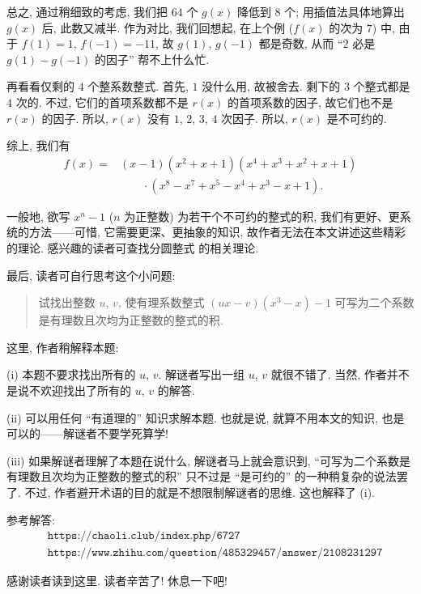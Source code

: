 \begin{example}
    总之, 通过稍细致的考虑, 我们把 $64$ 个 $g(x)$ 降低到 $8$ 个; 用插值法具体地算出 $g(x)$ 后, 此数又减半. 作为对比, 我们回想起, 在上个例 ($f(x)$ 的次为 $7$) 中, 由于 $f(1) = 1$, $f(-1) = -11$, 故 $g(1)$, $g(-1)$ 都是奇数, 从而 ``$2$ 必是 $g(1) - g(-1)$ 的因子'' 帮不上什么忙.

    再看看仅剩的 $4$ 个整系数整式. 首先, $1$ 没什么用, 故被舍去. 剩下的 $3$ 个整式都是 $4$ 次的. 不过, 它们的首项系数都不是 $r(x)$ 的首项系数的因子, 故它们也不是 $r(x)$ 的因子. 所以, $r(x)$ 没有 $1$, $2$, $3$, $4$ 次因子. 所以, $r(x)$ 是不可约的.

    综上, 我们有
    \begin{align*}
        f(x)
        = {} & (x-1) (x^2+x+1) (x^4+x^3+x^2+x+1)       \\
             & \qquad \cdot (x^8-x^7+x^5-x^4+x^3-x+1).
    \end{align*}
\end{example}

\begin{remark}
    一般地, 欲写 $x^n - 1$ ($n$ 为正整数) 为若干个不可约的整式的积, 我们有更好、更系统的方法——可惜, 它需要更深、更抽象的知识, 故作者无法在本文讲述这些精彩的理论. 感兴趣的读者可查找分圆整式  的相关理论.
\end{remark}

最后, 读者可自行思考这个小问题:

\begin{quotation}
    试找出整数 $u$, $v$, 使有理系数整式 $(ux - v)(x^3 - x) - 1$ 可写为二个系数是有理数且次均为正整数的整式的积.
\end{quotation}

这里, 作者稍解释本题:

(i) 本题不要求找出所有的 $u$, $v$. 解谜者写出一组 $u$, $v$ 就很不错了. 当然, 作者并不是说不欢迎找出了所有的 $u$, $v$ 的解答.

(ii) 可以用任何 ``有道理的'' 知识求解本题. 也就是说, 就算不用本文的知识, 也是可以的——解谜者不要学死算学!

(iii) 如果解谜者理解了本题在说什么, 解谜者马上就会意识到, ``可写为二个系数是有理数且次均为正整数的整式的积'' 只不过是 ``是可约的'' 的一种稍复杂的说法罢了. 不过, 作者避开术语的目的就是不想限制解谜者的思维. 这也解释了 (i).

参考解答:
\begin{align*}
     & \texttt{https://chaoli.club/index.php/6727}                         \\
     & \texttt{https://www.zhihu.com/question/485329457/answer/2108231297}
\end{align*}

感谢读者读到这里. 读者辛苦了! 休息一下吧!
